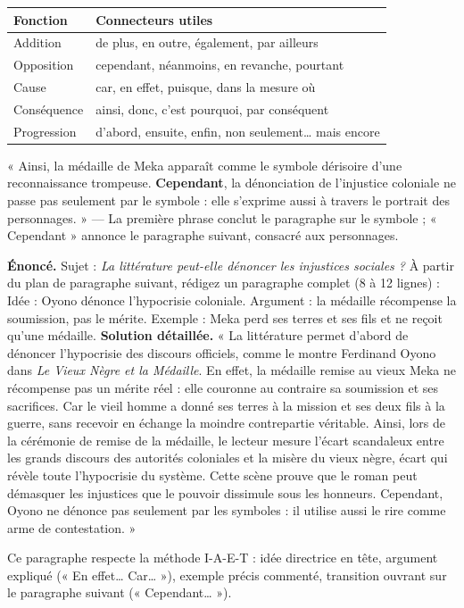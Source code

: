 \documentclass[11pt]{article}
\newcounter{popsec}
\newcounter{popsub}
\newcommand{\courssub}[1]{%
  \stepcounter{popsub}%
  \par\vspace{9pt}\noindent{\popxbold\fontsize{11.5}{13}\selectfont\color{popink}{\color{poporange}\thepopsec.\thepopsub}\hspace{6pt}#1}\par\nopagebreak\vspace{4pt}
}
\begin{document}
\begin{center}
\begin{tabularx}{\linewidth}{|l|X|}\hline
\rowcolor{popblueL} \textbf{Fonction} & \textbf{Connecteurs utiles} \\ \hline
Addition & de plus, en outre, également, par ailleurs \\ \hline
Opposition & cependant, néanmoins, en revanche, pourtant \\ \hline
Cause & car, en effet, puisque, dans la mesure où \\ \hline
Conséquence & ainsi, donc, c'est pourquoi, par conséquent \\ \hline
Progression & d'abord, ensuite, enfin, non seulement… mais encore \\ \hline
\end{tabularx}
\end{center}

\begin{exemplebox}
« Ainsi, la médaille de Meka apparaît comme le symbole dérisoire d'une reconnaissance trompeuse. \textbf{Cependant}, la dénonciation de l'injustice coloniale ne passe pas seulement par le symbole : elle s'exprime aussi à travers le portrait des personnages. » — La première phrase conclut le paragraphe sur le symbole ; « Cependant » annonce le paragraphe suivant, consacré aux personnages.
\end{exemplebox}

\courssub{Un paragraphe complet annoté}

\begin{exoresolu}
\textbf{Énoncé.} Sujet : \emph{La littérature peut-elle dénoncer les injustices sociales ?} À partir du plan de paragraphe suivant, rédigez un paragraphe complet (8 à 12 lignes) : Idée : Oyono dénonce l'hypocrisie coloniale. Argument : la médaille récompense la soumission, pas le mérite. Exemple : Meka perd ses terres et ses fils et ne reçoit qu'une médaille.
\tcblower
\textbf{Solution détaillée.} « La littérature permet d'abord de dénoncer l'hypocrisie des discours officiels, comme le montre Ferdinand Oyono dans \emph{Le Vieux Nègre et la Médaille}. En effet, la médaille remise au vieux Meka ne récompense pas un mérite réel : elle couronne au contraire sa soumission et ses sacrifices. Car le vieil homme a donné ses terres à la mission et ses deux fils à la guerre, sans recevoir en échange la moindre contrepartie véritable. Ainsi, lors de la cérémonie de remise de la médaille, le lecteur mesure l'écart scandaleux entre les grands discours des autorités coloniales et la misère du vieux nègre, écart qui révèle toute l'hypocrisie du système. Cette scène prouve que le roman peut démasquer les injustices que le pouvoir dissimule sous les honneurs. Cependant, Oyono ne dénonce pas seulement par les symboles : il utilise aussi le rire comme arme de contestation. »
\par\smallskip
Ce paragraphe respecte la méthode I-A-E-T : idée directrice en tête, argument expliqué (« En effet… Car… »), exemple précis commenté, transition ouvrant sur le paragraphe suivant (« Cependant… »).
\end{exoresolu}
\end{document}

